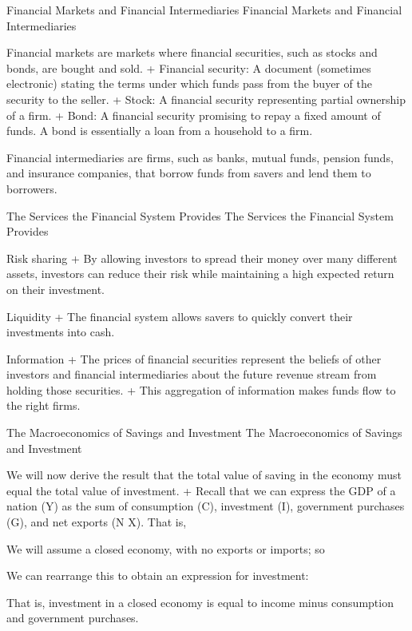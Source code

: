 \documentclass[
  12pt,
  ignorenonframetext,
]{beamer}
\begin{document}
\begin{frame}{Financial Markets and Financial Intermediaries}
\label{financial-markets-and-financial-intermediaries}
Financial Markets and Financial Intermediaries

Financial markets are markets where financial securities, such as stocks
and bonds, are bought and sold. + Financial security: A document
(sometimes electronic) stating the terms under which funds pass from the
buyer of the security to the seller. + Stock: A financial security
representing partial ownership of a firm. + Bond: A financial security
promising to repay a fixed amount of funds. A bond is essentially a loan
from a household to a firm.

Financial intermediaries are firms, such as banks, mutual funds, pension
funds, and insurance companies, that borrow funds from savers and lend
them to borrowers.
\end{frame}

\begin{frame}{The Services the Financial System Provides}
\label{the-services-the-financial-system-provides}
The Services the Financial System Provides

Risk sharing + By allowing investors to spread their money over many
different assets, investors can reduce their risk while maintaining a
high expected return on their investment.

Liquidity + The financial system allows savers to quickly convert their
investments into cash.

Information + The prices of financial securities represent the beliefs
of other investors and financial intermediaries about the future revenue
stream from holding those securities. + This aggregation of information
makes funds flow to the right firms.
\end{frame}

\begin{frame}{The Macroeconomics of Savings and Investment}
\label{the-macroeconomics-of-savings-and-investment}
The Macroeconomics of Savings and Investment

We will now derive the result that the total value of saving in the
economy must equal the total value of investment. + Recall that we can
express the GDP of a nation (Y) as the sum of consumption (C),
investment (I), government purchases (G), and net exports (N X). That
is,

We will assume a closed economy, with no exports or imports; so

We can rearrange this to obtain an expression for investment:

That is, investment in a closed economy is equal to income minus
consumption and government purchases.
\end{frame}
\end{document}

